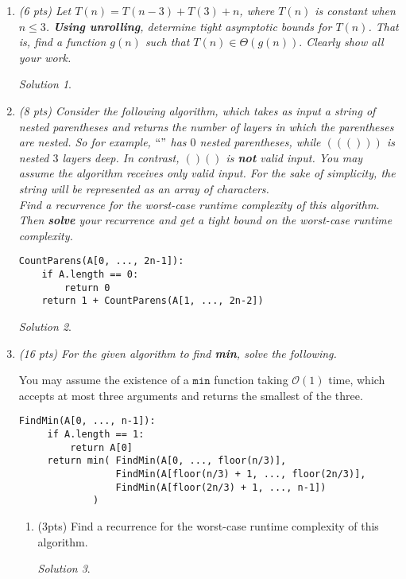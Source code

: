 \documentclass[12pt]{article}
\theoremstyle{remark}
\newtheorem*{solution}{Solution}
\newcommand{\makenonemptybox}[2]{%
\item[]
\fbox{%
\parbox[c][#1][t]{\dimexpr\linewidth-2\fboxsep-2\fboxrule}{
  \hrule width \hsize height 0pt
  #2
 }%
}%
\par\vspace{\ht\strutbox}
}
\begin{document}
\begin{enumerate}
\pagebreak
\item {\itshape (6 pts) Let $T(n) = T(n-3) + T(3) + n$, where $T(n)$ is constant when $n \leq 3$. \textbf{Using unrolling}, determine tight asymptotic bounds for $T(n)$. That is, find a function $g(n)$ such that $T(n) \in \Theta(g(n)).$ Clearly show all your work.}
\begin{solution}
\end{solution}


\pagebreak
\item{\itshape (8 pts) Consider the following algorithm, which takes as input a string of nested parentheses and returns the number of layers in which the parentheses are nested. So for example, $``"$ has $0$ nested parentheses, while $((()))$ is nested $3$ layers deep. In contrast, $()()$ is \textbf{not} valid input. You may assume the algorithm receives only valid input. For the sake of simplicity, the string will be represented as an array of characters. \\

\noindent Find a recurrence for the worst-case runtime complexity of this algorithm. Then \textbf{solve} your recurrence and get a tight bound on the worst-case runtime complexity.}
\begin{verbatim}
CountParens(A[0, ..., 2n-1]):
    if A.length == 0:
        return 0
    return 1 + CountParens(A[1, ..., 2n-2])
\end{verbatim}
\begin{solution}
\end{solution}

\pagebreak
\item{\itshape (16 pts) For the given algorithm to find \textbf{min}, solve the following.

You may assume the existence of a $\texttt{min}$ function taking $\mathcal{O}(1)$ time, which accepts at most three arguments and returns the smallest of the three.}
\begin{verbatim}
FindMin(A[0, ..., n-1]):
     if A.length == 1:
         return A[0]
     return min( FindMin(A[0, ..., floor(n/3)], 
                 FindMin(A[floor(n/3) + 1, ..., floor(2n/3)],
                 FindMin(A[floor(2n/3) + 1, ..., n-1])
             )
\end{verbatim}
\begin{enumerate}[label=(\alph*)]
\item (3pts) Find a recurrence for the worst-case runtime complexity of this algorithm.
\begin{solution}
\end{solution}
\pagebreak


\end{enumerate}
\end{enumerate}
\end{document}
